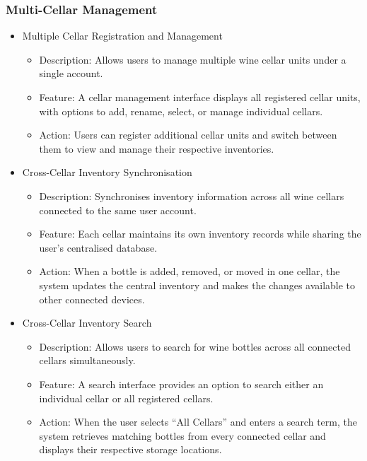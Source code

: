 \documentclass[conference]{IEEEtran}
\begin{document}
\subsubsection{Multi-Cellar Management}
\begin{itemize}
    \item Multiple Cellar Registration and Management
    \begin{itemize}
        \item Description: Allows users to manage multiple wine cellar units under a single account.
        \item Feature: A cellar management interface displays all registered cellar units, with options to add, rename, select, or manage individual cellars.
        \item Action: Users can register additional cellar units and switch between them to view and manage their respective inventories.
    \end{itemize}

    \item Cross-Cellar Inventory Synchronisation
    \begin{itemize}
        \item Description: Synchronises inventory information across all wine cellars connected to the same user account.
        \item Feature: Each cellar maintains its own inventory records while sharing the user's centralised database.
        \item Action: When a bottle is added, removed, or moved in one cellar, the system updates the central inventory and makes the changes available to other connected devices.
    \end{itemize}

    \item Cross-Cellar Inventory Search
    \begin{itemize}
        \item Description: Allows users to search for wine bottles across all connected cellars simultaneously.
        \item Feature: A search interface provides an option to search either an individual cellar or all registered cellars.
        \item Action: When the user selects ``All Cellars'' and enters a search term, the system retrieves matching bottles from every connected cellar and displays their respective storage locations.
    \end{itemize}
\end{itemize}
\end{document}
